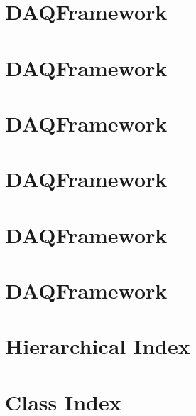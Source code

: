 \let\mypdfximage\pdfximage\def\pdfximage{\immediate\mypdfximage}\documentclass[twoside]{book}
\newcommand{\+}{\discretionary{\mbox{\scriptsize$\hookleftarrow$}}{}{}}
\begin{document}
\chapter{DAQFramework}
\label{md_src_Store_README}

\chapter{DAQFramework}
\label{md_src_Tool_README}

\chapter{DAQFramework}
\label{md_src_ToolChain_README}

\chapter{DAQFramework}
\label{md_tempinclude_README}

\chapter{DAQFramework}
\label{md_UserTools_README}

\chapter{DAQFramework}
\label{md_UserTools_template_README}

\chapter{Hierarchical Index}

\chapter{Class Index}

\end{document}
